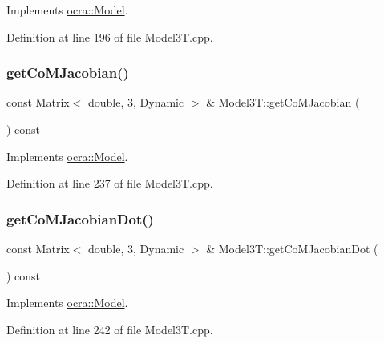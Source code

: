 Implements \hyperlink{classocra_1_1Model_ad1a78d57aca4a4128c54d479f30afd82}{ocra\+::\+Model}.



Definition at line 196 of file Model3\+T.\+cpp.

\hypertarget{classModel3T_addc6149d27f7cb5d3c8ab453e55b88e4}{}\label{classModel3T_addc6149d27f7cb5d3c8ab453e55b88e4} 
\subsubsection{\texorpdfstring{get\+Co\+M\+Jacobian()}{getCoMJacobian()}}
{\footnotesize\ttfamily const Matrix$<$ double, 3, Dynamic $>$ \& Model3\+T\+::get\+Co\+M\+Jacobian (\begin{DoxyParamCaption}{ }\end{DoxyParamCaption}) const\hspace{0.3cm}{\ttfamily [virtual]}}



Implements \hyperlink{classocra_1_1Model_a4b148504194036b0faafe619e5b98f59}{ocra\+::\+Model}.



Definition at line 237 of file Model3\+T.\+cpp.

\hypertarget{classModel3T_a6b63e04105ce4fa8026681ea1109702e}{}\label{classModel3T_a6b63e04105ce4fa8026681ea1109702e} 
\subsubsection{\texorpdfstring{get\+Co\+M\+Jacobian\+Dot()}{getCoMJacobianDot()}}
{\footnotesize\ttfamily const Matrix$<$ double, 3, Dynamic $>$ \& Model3\+T\+::get\+Co\+M\+Jacobian\+Dot (\begin{DoxyParamCaption}{ }\end{DoxyParamCaption}) const\hspace{0.3cm}{\ttfamily [virtual]}}



Implements \hyperlink{classocra_1_1Model_abfc71fa0f52145b1df92bdbd0963c926}{ocra\+::\+Model}.



Definition at line 242 of file Model3\+T.\+cpp.


